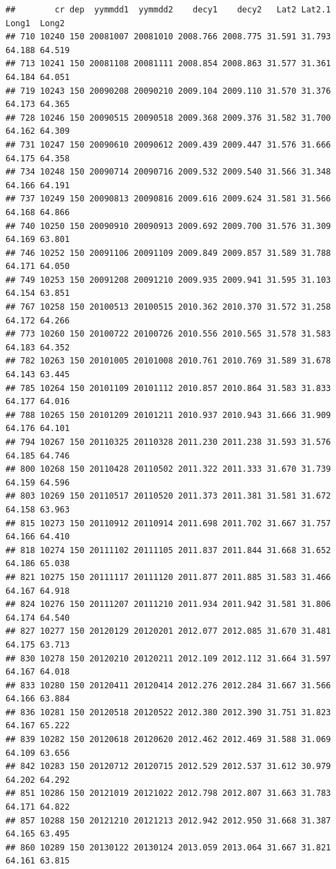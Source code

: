 \documentclass[]{article}
\begin{document}
\begin{verbatim}
##        cr dep  yymmdd1  yymmdd2    decy1    decy2   Lat2 Lat2.1  Long1  Long2
## 710 10240 150 20081007 20081010 2008.766 2008.775 31.591 31.793 64.188 64.519
## 713 10241 150 20081108 20081111 2008.854 2008.863 31.577 31.361 64.184 64.051
## 719 10243 150 20090208 20090210 2009.104 2009.110 31.570 31.376 64.173 64.365
## 728 10246 150 20090515 20090518 2009.368 2009.376 31.582 31.700 64.162 64.309
## 731 10247 150 20090610 20090612 2009.439 2009.447 31.576 31.666 64.175 64.358
## 734 10248 150 20090714 20090716 2009.532 2009.540 31.566 31.348 64.166 64.191
## 737 10249 150 20090813 20090816 2009.616 2009.624 31.581 31.566 64.168 64.866
## 740 10250 150 20090910 20090913 2009.692 2009.700 31.576 31.309 64.169 63.801
## 746 10252 150 20091106 20091109 2009.849 2009.857 31.589 31.788 64.171 64.050
## 749 10253 150 20091208 20091210 2009.935 2009.941 31.595 31.103 64.154 63.851
## 767 10258 150 20100513 20100515 2010.362 2010.370 31.572 31.258 64.172 64.266
## 773 10260 150 20100722 20100726 2010.556 2010.565 31.578 31.583 64.183 64.352
## 782 10263 150 20101005 20101008 2010.761 2010.769 31.589 31.678 64.143 63.445
## 785 10264 150 20101109 20101112 2010.857 2010.864 31.583 31.833 64.177 64.016
## 788 10265 150 20101209 20101211 2010.937 2010.943 31.666 31.909 64.176 64.101
## 794 10267 150 20110325 20110328 2011.230 2011.238 31.593 31.576 64.185 64.746
## 800 10268 150 20110428 20110502 2011.322 2011.333 31.670 31.739 64.159 64.596
## 803 10269 150 20110517 20110520 2011.373 2011.381 31.581 31.672 64.158 63.963
## 815 10273 150 20110912 20110914 2011.698 2011.702 31.667 31.757 64.166 64.410
## 818 10274 150 20111102 20111105 2011.837 2011.844 31.668 31.652 64.186 65.038
## 821 10275 150 20111117 20111120 2011.877 2011.885 31.583 31.466 64.167 64.918
## 824 10276 150 20111207 20111210 2011.934 2011.942 31.581 31.806 64.174 64.540
## 827 10277 150 20120129 20120201 2012.077 2012.085 31.670 31.481 64.175 63.713
## 830 10278 150 20120210 20120211 2012.109 2012.112 31.664 31.597 64.167 64.018
## 833 10280 150 20120411 20120414 2012.276 2012.284 31.667 31.566 64.166 63.884
## 836 10281 150 20120518 20120522 2012.380 2012.390 31.751 31.823 64.167 65.222
## 839 10282 150 20120618 20120620 2012.462 2012.469 31.588 31.069 64.109 63.656
## 842 10283 150 20120712 20120715 2012.529 2012.537 31.612 30.979 64.202 64.292
## 851 10286 150 20121019 20121022 2012.798 2012.807 31.663 31.783 64.171 64.822
## 857 10288 150 20121210 20121213 2012.942 2012.950 31.668 31.387 64.165 63.495
## 860 10289 150 20130122 20130124 2013.059 2013.064 31.667 31.821 64.161 63.815

\end{verbatim}
\end{document}

